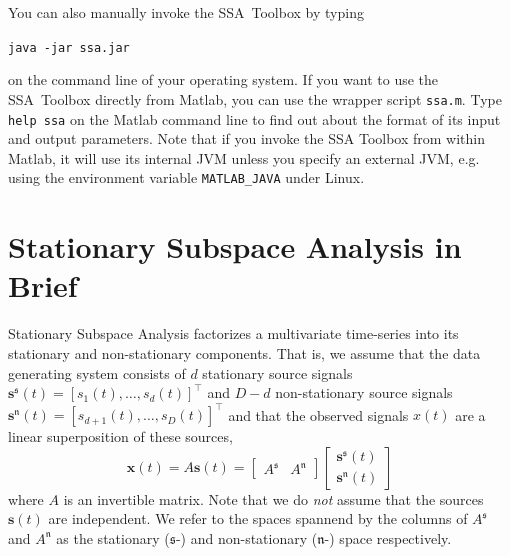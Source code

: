 \documentclass{article}
\newcommand{\1}{\ensuremath{\mathds{1}}}
\newcommand{\s}{\ensuremath{\mathfrak{s}}}
\newcommand{\n}{\ensuremath{\mathfrak{n}}}
\newcommand{\0}{\ensuremath{0}}
\begin{document}
You can also manually invoke the SSA~Toolbox by typing
\begin{center}
  \texttt{java -jar ssa.jar}
\end{center}
on the command line of your operating system. If you want to use the SSA~Toolbox directly 
from Matlab, you can use the wrapper script \texttt{ssa.m}. Type \texttt{help ssa} on 
the Matlab command line to find out about the format of its input and output parameters. 
Note that if you invoke the SSA Toolbox from within Matlab, it will use its
internal JVM unless you specify an external JVM, e.g. using the environment
variable \texttt{MATLAB\_JAVA} under Linux.

\section{Stationary Subspace Analysis in Brief}

Stationary Subspace Analysis \cite{PRL:SSA:2009} factorizes a multivariate time-series 
into its stationary and non-stationary components. That is, we assume that the data 
generating system consists of $d$ stationary source signals 
${\mathbf s^\s}(t) = [s_1(t), \dots, s_d(t)]^\top$ and $D-d$ non-stationary source signals
${\mathbf s^\n}(t) = [s_{d+1}(t), \dots, s_D(t)]^\top$ and that the observed signals 
$x(t)$ are a linear superposition of these sources,
\begin{equation}
  {\mathbf x}(t) = A {\mathbf s}(t) = 
    \begin{bmatrix} A^{\s} & A^{\n} \end{bmatrix}
    \begin{bmatrix} {\mathbf s^{\s}}(t) \\ {\mathbf s^{\n}}(t) \end{bmatrix}
\label{eq:mixing_model}
\end{equation}
where $A$ is an invertible matrix. Note that we do \textit{not} assume that 
the sources ${\mathbf s}(t)$ are independent. We refer to the spaces spannend 
by the columns of $A^{\s}$ and $A^{\n}$ as the stationary ($\s$-) and 
non-stationary ($\n$-) space respectively.  
\end{document}

